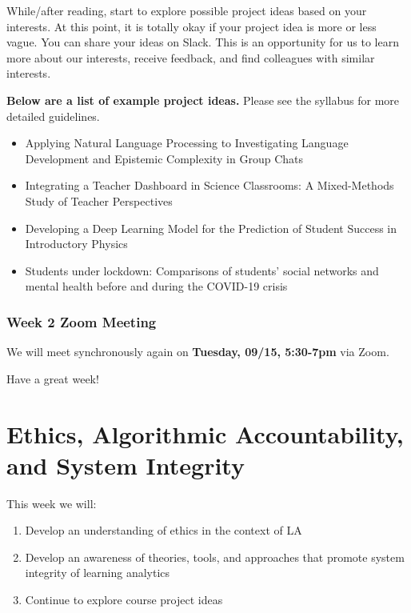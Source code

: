 \documentclass[
]{book}
\providecommand{\tightlist}{%
  \setlength{\itemsep}{0pt}\setlength{\parskip}{0pt}}
\begin{document}
While/after reading, start to explore possible project ideas based on your interests. At this point, it is totally okay if your project idea is more or less vague. You can share your ideas on Slack. This is an opportunity for us to learn more about our interests, receive feedback, and find colleagues with similar interests.

\textbf{Below are a list of example project ideas.} Please see the syllabus for more detailed guidelines.

\begin{itemize}
\tightlist
\item
  Applying Natural Language Processing to Investigating Language Development and Epistemic Complexity in Group Chats
\item
  Integrating a Teacher Dashboard in Science Classrooms: A Mixed-Methods Study of Teacher Perspectives
\item
  Developing a Deep Learning Model for the Prediction of Student Success in Introductory Physics
\item
  Students under lockdown: Comparisons of students' social networks and mental health before and during the COVID-19 crisis
\end{itemize}

\hypertarget{week-2-zoom-meeting}{%
\subsection{Week 2 Zoom Meeting}\label{week-2-zoom-meeting}}

We will meet synchronously again on \textbf{Tuesday, 09/15, 5:30-7pm} via Zoom.

Have a great week!

\hypertarget{ethics-algorithmic-accountability-and-system-integrity}{%
\chapter{Ethics, Algorithmic Accountability, and System Integrity}\label{ethics-algorithmic-accountability-and-system-integrity}}

This week we will:

\begin{enumerate}
\def\labelenumi{\arabic{enumi}.}
\tightlist
\item
  Develop an understanding of ethics in the context of LA
\item
  Develop an awareness of theories, tools, and approaches that promote system integrity of learning analytics
\item
  Continue to explore course project ideas
\end{enumerate}
\end{document}

